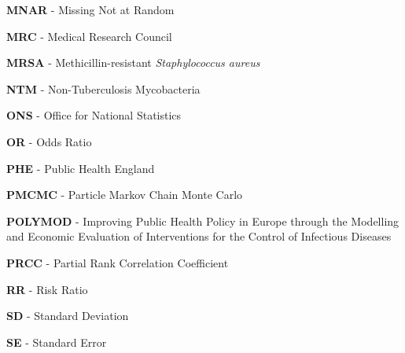 \documentclass[11pt,twoside]{bristolthesis}
\begin{document}
\begin{acronyms}
      \par
      
      \textbf{MNAR} - Missing Not at Random
      
      \par
      
      \textbf{MRC} - Medical Research Council
      
      \par
      
      \textbf{MRSA} - Methicillin-resistant \emph{Staphylococcus aureus}
      
      \par
      
      \textbf{NTM} - Non-Tuberculosis Mycobacteria
      
      \par
      
      \textbf{ONS} - Office for National Statistics
      
      \par
      
      \textbf{OR} - Odds Ratio
      
      \par
      
      \textbf{PHE} - Public Health England
      
      \par
      
      \textbf{PMCMC} - Particle Markov Chain Monte Carlo
      
      \par
      
      \textbf{POLYMOD} - Improving Public Health Policy in Europe through the Modelling and Economic Evaluation of Interventions for the Control of Infectious Diseases
      
      \par
      
      \textbf{PRCC} - Partial Rank Correlation Coefficient
      
      \par
      
      \textbf{RR} - Risk Ratio
      
      \par
      
      \textbf{SD} - Standard Deviation
      
      \par
      
      \textbf{SE} - Standard Error
      

\end{acronyms}
\end{document}
